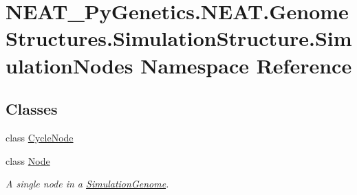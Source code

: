 \hypertarget{namespaceNEAT__PyGenetics_1_1NEAT_1_1GenomeStructures_1_1SimulationStructure_1_1SimulationNodes}{}\section{N\+E\+A\+T\+\_\+\+Py\+Genetics.\+N\+E\+A\+T.\+Genome\+Structures.\+Simulation\+Structure.\+Simulation\+Nodes Namespace Reference}
\label{namespaceNEAT__PyGenetics_1_1NEAT_1_1GenomeStructures_1_1SimulationStructure_1_1SimulationNodes}
\subsection*{Classes}
\begin{DoxyCompactItemize}
\item 
class \hyperlink{classNEAT__PyGenetics_1_1NEAT_1_1GenomeStructures_1_1SimulationStructure_1_1SimulationNodes_1_1CycleNode}{Cycle\+Node}
\item 
class \hyperlink{classNEAT__PyGenetics_1_1NEAT_1_1GenomeStructures_1_1SimulationStructure_1_1SimulationNodes_1_1Node}{Node}
\begin{DoxyCompactList}\small\item\em A single node in a \hyperlink{namespaceNEAT__PyGenetics_1_1NEAT_1_1GenomeStructures_1_1SimulationStructure_1_1SimulationGenome}{Simulation\+Genome}. \end{DoxyCompactList}\end{DoxyCompactItemize}
